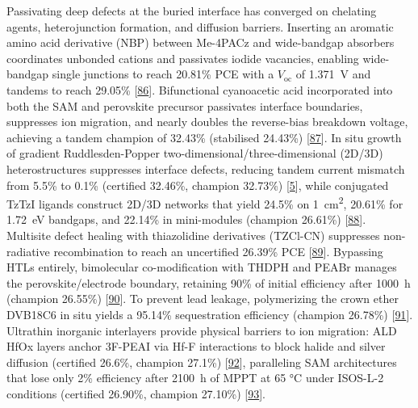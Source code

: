 \documentclass[
  11pt,
]{article}
\begin{document}
Passivating deep defects at the buried interface has converged on
chelating agents, heterojunction formation, and diffusion barriers.
Inserting an aromatic amino acid derivative (NBP) between Me-4PACz and
wide-bandgap absorbers coordinates unbonded  cations and
passivates iodide vacancies, enabling wide-bandgap single junctions to
reach 20.81\% PCE with a \(V_\mathrm{oc}\) of \qty{1.371}{\volt} and
tandems to reach 29.05\%
{[}\href{https://doi.org/10.1002/smll.73595}{86}{]}. Bifunctional
cyanoacetic acid incorporated into both the SAM and perovskite precursor
passivates interface boundaries, suppresses ion migration, and nearly
doubles the reverse-bias breakdown voltage, achieving a tandem champion
of 32.43\% (stabilised 24.43\%)
{[}\href{https://doi.org/10.1002/adma.72738}{87}{]}. In situ growth of
gradient Ruddlesden-Popper two-dimensional/three-dimensional (2D/3D)
heterostructures suppresses interface defects, reducing tandem current
mismatch from 5.5\% to 0.1\% (certified 32.46\%, champion 32.73\%)
{[}\href{https://doi.org/10.1021/acsenergylett.5c04127}{5}{]}, while
conjugated TzTzI ligands construct 2D/3D networks that yield 24.5\% on
\qty{1}{\centi\meter\squared}, 20.61\% for \qty{1.72}{\electronvolt}
bandgaps, and 22.14\% in mini-modules (champion 26.61\%)
{[}\href{https://doi.org/10.1002/adma.202520251}{88}{]}. Multisite
defect healing with thiazolidine derivatives (TZCl-CN) suppresses
non-radiative recombination to reach an uncertified 26.39\% PCE
{[}\href{https://doi.org/10.1021/acsenergylett.5c03328}{89}{]}.
Bypassing HTLs entirely, bimolecular co-modification with THDPH and
PEABr manages the perovskite/electrode boundary, retaining 90\% of
initial efficiency after \qty{1000}{\hour} (champion 26.55\%)
{[}\href{https://doi.org/10.1002/adfm.76198}{90}{]}. To prevent lead
leakage, polymerizing the crown ether DVB18C6 in situ yields a 95.14\%
 sequestration efficiency (champion 26.78\%)
{[}\href{https://doi.org/10.1021/acsenergylett.6c00703}{91}{]}.
Ultrathin inorganic interlayers provide physical barriers to ion
migration: ALD HfOx layers anchor 3F-PEAI via Hf-F interactions to block
halide and silver diffusion (certified 26.6\%, champion 27.1\%)
{[}\href{https://doi.org/10.1126/science.aea3339}{92}{]}, paralleling
SAM architectures that lose only 2\% efficiency after \qty{2100}{\hour}
of MPPT at 65 °C under ISOS-L-2 conditions (certified 26.90\%, champion
27.10\%) {[}\href{https://doi.org/10.1038/s41467-026-73426-0}{93}{]}.
\end{document}
